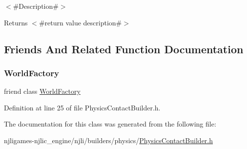 $<$\#\+Description\#$>$

\begin{DoxyReturn}{Returns}
$<$\#return value description\#$>$ 
\end{DoxyReturn}


\subsection{Friends And Related Function Documentation}
\mbox{\label{classnjli_1_1_physics_contact_builder_acb96ebb09abe8f2a37a915a842babfac}} 
\subsubsection{\texorpdfstring{World\+Factory}{WorldFactory}}
{\footnotesize\ttfamily friend class \mbox{\hyperlink{classnjli_1_1_world_factory}{World\+Factory}}\hspace{0.3cm}{\ttfamily [friend]}}



Definition at line 25 of file Physics\+Contact\+Builder.\+h.



The documentation for this class was generated from the following file\+:\begin{DoxyCompactItemize}
\item 
njligames-\/njlic\+\_\+engine/njli/builders/physics/\mbox{\hyperlink{_physics_contact_builder_8h}{Physics\+Contact\+Builder.\+h}}\end{DoxyCompactItemize}
